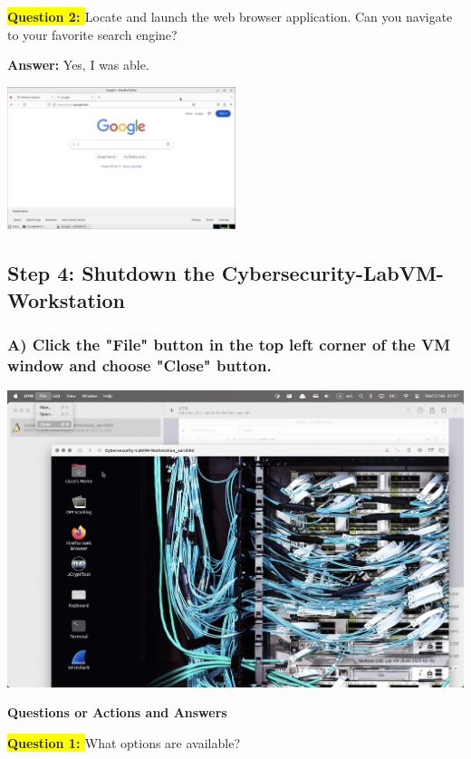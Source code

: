 \documentclass{article}
\begin{document}
\newpage
\textbf{\colorbox{yellow}{Question 2: }}Locate and launch the web browser application. Can you navigate to your favorite search engine?

\textbf{Answer: } Yes, I was able. 

\includegraphics[width=0.5\textwidth]{Part2/Step2/5.png}

\subsection*{Step 4: Shutdown the Cybersecurity-LabVM-Workstation} 

\subsubsection*{A) Click the "File" button in the top left corner of the VM window and choose "Close" button.}

\includegraphics[width=1\textwidth]{Part2/Step4/1.png}

\newpage

\textbf{Questions or Actions and Answers} 

\vspace{1\baselineskip}

\textbf{\colorbox{yellow}{Question 1: }} What options are available? 
\end{document}
